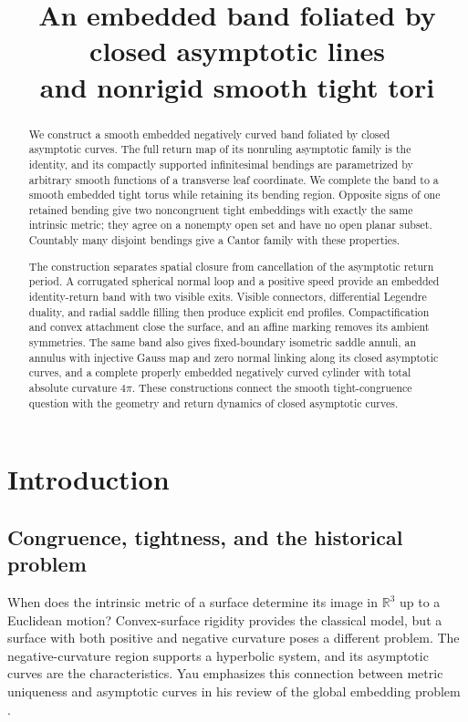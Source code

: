 \documentclass[11pt]{amsart}
\title[Closed asymptotic bands and tight tori]{An embedded band foliated by closed asymptotic lines\\and nonrigid smooth tight tori}
\author{}
\date{}
\theoremstyle{definition}
\theoremstyle{remark}
\newcommand{\R}{\mathbb R}\newcommand{\Sph}{\mathbb S}
\numberwithin{equation}{section}
\begin{document}
\begin{abstract}
We construct a smooth embedded negatively curved band foliated by closed
asymptotic curves. The full return map of its nonruling asymptotic family
is the identity, and its compactly supported infinitesimal bendings are
parametrized by arbitrary smooth functions of a transverse leaf coordinate.
We complete the band to a smooth embedded tight torus while retaining
its bending region. Opposite signs of one retained bending give two
noncongruent tight embeddings with exactly the same intrinsic metric;
they agree on a nonempty open set and have no open planar subset.
Countably many disjoint bendings give a Cantor family with these properties.

The construction separates spatial closure from cancellation of the
asymptotic return period. A corrugated spherical normal loop and a
positive speed provide an embedded identity-return band with two visible
exits. Visible connectors, differential Legendre duality, and radial
saddle filling then produce explicit end profiles. Compactification and
convex attachment close the surface, and an affine marking removes its
ambient symmetries. The same band also gives fixed-boundary isometric
saddle annuli, an annulus with injective Gauss map and zero normal
linking along its closed asymptotic curves, and a complete properly
embedded negatively curved cylinder with total absolute curvature $4\pi$.
These constructions connect the smooth tight-congruence question with
the geometry and return dynamics of closed asymptotic curves.
\end{abstract}
\maketitle

\section{Introduction}\label{sec:intro}
\subsection{Congruence, tightness, and the historical problem}
When does the intrinsic metric of a surface determine its image in
$\R^3$ up to a Euclidean motion? Convex-surface rigidity provides the
classical model, but a surface with both positive and negative curvature
poses a different problem. The negative-curvature region supports a
hyperbolic system, and its asymptotic curves are the characteristics.
Yau emphasizes this connection between metric uniqueness and asymptotic
curves in his review of the global embedding problem
\cite[pp.~235--236]{YauReview}.
\end{document}
